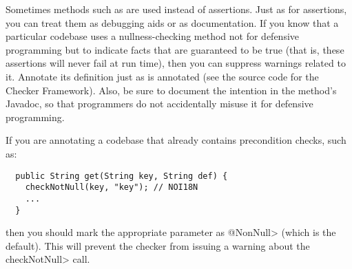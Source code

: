 %
%
%
%


Sometimes methods such as
 are used
instead of assertions.  Just as for assertions, you can treat them as
debugging aids or as documentation.
If you know that a particular codebase uses
a nullness-checking method not for defensive programming but to indicate
facts that are guaranteed to be true (that is, these assertions will never
fail at run time), then you can suppress
warnings related to it.
Annotate its definition just as
 is annotated (see the
source code for the Checker Framework).
Also, be sure to document the intention in the method's Javadoc, so that
programmers do not
accidentally misuse it for defensive programming.


If you are annotating a codebase that already contains precondition checks,
such as:

\begin{Verbatim}
  public String get(String key, String def) {
    checkNotNull(key, "key"); // NOI18N
    ...
  }
\end{Verbatim}

\noindent
then you should mark the appropriate parameter as \<@NonNull> (which is the
default).  This will prevent the checker from issuing a warning about the
\<checkNotNull> call.



